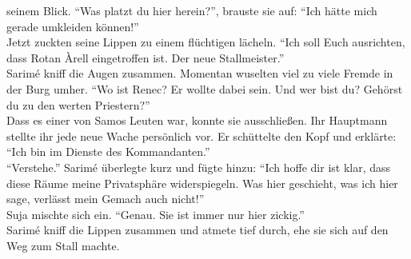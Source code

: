 seinem Blick. ``Was platzt du hier herein?'', brauste sie auf: ``Ich hätte mich gerade umkleiden 
können!''\\
Jetzt zuckten seine Lippen zu einem flüchtigen lächeln. ``Ich soll Euch ausrichten, dass Rotan 
Àrell eingetroffen ist. Der neue Stallmeister.''\\
Sarimé kniff die Augen zusammen. Momentan wuselten viel zu viele Fremde in der Burg umher. ``Wo ist 
Renec? Er wollte dabei sein. Und wer bist du? Gehörst du zu den werten Priestern?''\\
Dass es einer von Samos Leuten war, konnte sie ausschließen. Ihr Hauptmann stellte ihr jede neue 
Wache persönlich vor. Er schüttelte den Kopf und erklärte: ``Ich bin im Dienste des 
Kommandanten.''\\
``Verstehe.'' Sarimé überlegte kurz und fügte hinzu: ``Ich hoffe dir ist klar, dass diese Räume 
meine Privatsphäre widerspiegeln. Was hier geschieht, was ich hier sage, verlässt mein Gemach auch 
nicht!''\\
Suja mischte sich ein. ``Genau. Sie ist immer nur hier zickig.''\\
Sarimé kniff die Lippen zusammen und atmete tief durch, ehe sie sich auf den Weg zum Stall machte.\\

